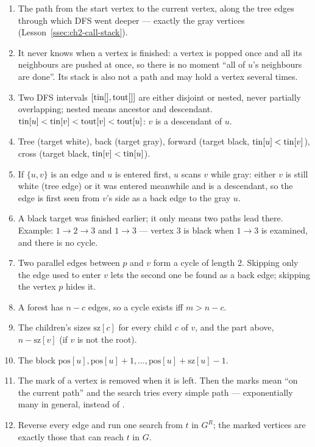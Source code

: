 \begin{solutionbox}[Answers]
\begin{enumerate}[leftmargin=*]
    \item The path from the start vertex to the current vertex, along the tree edges through which DFS went deeper --- exactly the gray vertices (Lesson~\ref{ssec:ch2-call-stack}).
    \item It never knows when a vertex is finished: a vertex is popped once and all its neighbours are pushed at once, so there is no moment ``all of $u$'s neighbours are done''. Its stack is also not a path and may hold a vertex several times.
    \item Two DFS intervals $[\mathrm{tin}[], \mathrm{tout}[]]$ are either disjoint or nested, never partially overlapping; nested means ancestor and descendant. $\mathrm{tin}[u] < \mathrm{tin}[v] < \mathrm{tout}[v] < \mathrm{tout}[u]$: $v$ is a descendant of $u$.
    \item Tree (target white), back (target gray), forward (target black, $\mathrm{tin}[u] < \mathrm{tin}[v]$), cross (target black, $\mathrm{tin}[v] < \mathrm{tin}[u]$).
    \item If $\{u, v\}$ is an edge and $u$ is entered first, $u$ scans $v$ while gray: either $v$ is still white (tree edge) or it was entered meanwhile and is a descendant, so the edge is first seen from $v$'s side as a back edge to the gray $u$.
    \item A black target was finished earlier; it only means two paths lead there. Example: $1 \to 2 \to 3$ and $1 \to 3$ --- vertex 3 is black when $1 \to 3$ is examined, and there is no cycle.
    \item Two parallel edges between $p$ and $v$ form a cycle of length 2. Skipping only the edge used to enter $v$ lets the second one be found as a back edge; skipping the vertex $p$ hides it.
    \item A forest has $n - c$ edges, so a cycle exists iff $m > n - c$.
    \item The children's sizes $\mathrm{sz}[c]$ for every child $c$ of $v$, and the part above, $n - \mathrm{sz}[v]$ (if $v$ is not the root).
    \item The block $\mathrm{pos}[u], \mathrm{pos}[u] + 1, \dots, \mathrm{pos}[u] + \mathrm{sz}[u] - 1$.
    \item The mark of a vertex is removed when it is left. Then the marks mean ``on the current path'' and the search tries every simple path --- exponentially many in general, instead of \VE.
    \item Reverse every edge and run one search from $t$ in $G^R$; the marked vertices are exactly those that can reach $t$ in $G$.
\end{enumerate}
\end{solutionbox}

